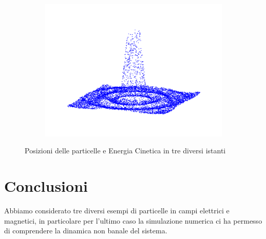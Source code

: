 \documentclass[11pt]{article}
\begin{document}
\begin{figure}
\begin{subfigure}{0.33\textwidth}
    \includegraphics[width=1.\textwidth]{img/distrib_160.png}
\end{subfigure}
\caption[short]{Posizioni delle particelle e Energia Cinetica in tre diversi istanti}
\end{figure}


\section{Conclusioni}
Abbiamo considerato tre diversi esempi di particelle in campi elettrici e magnetici, in particolare per l'ultimo caso la simulazione numerica ci ha permesso di comprendere la dinamica non banale del sistema.


\end{document}
